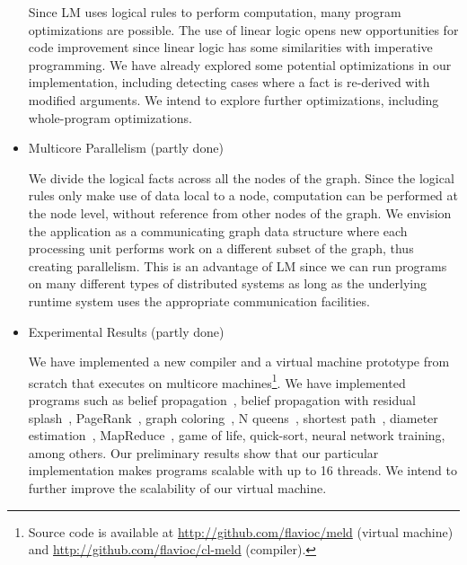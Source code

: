 \begin{itemize}
   Since LM uses logical rules to perform computation, many program optimizations are possible. The use of linear logic
   opens new opportunities for code improvement since linear logic has some similarities with imperative programming.
   We have already explored some potential optimizations in our implementation, including detecting cases where a fact
   is re-derived with modified arguments. We intend to explore further optimizations, including whole-program optimizations.
   
   \item Multicore Parallelism (partly done)
   
   We divide the logical facts across all the nodes of the graph. Since the
   logical rules only make use of data local to a node, computation can be performed at the
   node level, without reference from other nodes of the graph. We envision the application as
   a communicating graph data structure where each processing unit performs work on a different subset of the graph,
   thus creating parallelism. This is an advantage of LM since we can run programs on many different types
   of distributed systems as long as the underlying runtime system uses the appropriate communication facilities.

   \item Experimental Results (partly done)

   We have implemented a new compiler and a virtual machine prototype from scratch that executes on multicore machines\footnote{Source code is available at \url{http://github.com/flavioc/meld} (virtual machine) and \url{http://github.com/flavioc/cl-meld} (compiler).}.
   We have implemented programs such as belief propagation~\cite{Gonzalez+al:aistats09paraml},
   belief propagation with residual splash~\cite{Gonzalez+al:aistats09paraml}, PageRank~\cite{Page:2001:MNR},
   graph coloring~\cite{PSP:2032868}, N queens~\cite{8queens}, shortest path~\cite{Dijkstra}, diameter estimation~\cite{5234320}, MapReduce~\cite{Dean:2008:MSD:1327452.1327492}, game of life, quick-sort, neural network training, among others.
   Our preliminary results show that our particular implementation makes programs scalable with up to 16 threads. We intend to
   further improve the scalability of our virtual machine.
   
\end{itemize}
